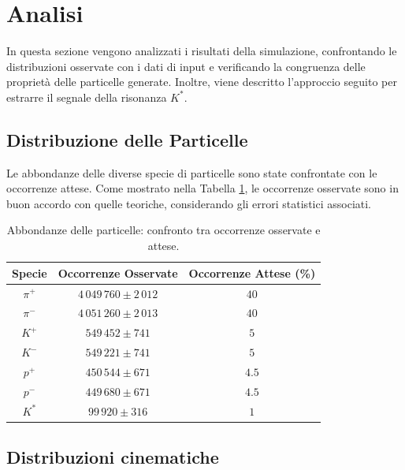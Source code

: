 \documentclass[a4paper,11pt]{article}
\begin{document}
\clearpage

\section{Analisi}

In questa sezione vengono analizzati i risultati della simulazione, confrontando le distribuzioni osservate con i dati di input e verificando la congruenza delle proprietà delle particelle generate. Inoltre, viene descritto l'approccio seguito per estrarre il segnale della risonanza \( K^* \).

\subsection{Distribuzione delle Particelle}

Le abbondanze delle diverse specie di particelle sono state confrontate con le occorrenze attese. Come mostrato nella Tabella \ref{tab:abbondanze}, le occorrenze osservate sono in buon accordo con quelle teoriche, considerando gli errori statistici associati.

\begin{table}[h!]
    \centering
    \begin{tabular}{|c|c|c|}
        \hline
        \textbf{Specie} & \textbf{Occorrenze Osservate} & \textbf{Occorrenze Attese (\%)} \\
        \hline
        $\pi^+$ & $4\,049\,760 \pm 2\,012$ & $40$ \\
        \hline
        $\pi^-$ & $4\,051\,260 \pm 2\,013$ & $40$ \\
        \hline
        $K^+$ & $549\,452 \pm 741$ & $5$ \\
        \hline
        $K^-$ & $549\,221 \pm 741$ & $5$ \\
        \hline
        $p^+$ & $450\,544 \pm 671$ & $4.5$ \\
        \hline
        $p^-$ & $449\,680 \pm 671$ & $4.5$ \\
        \hline
        $K^*$ & $99\,920 \pm 316$ & $1$ \\
        \hline
    \end{tabular}
    \caption{Abbondanze delle particelle: confronto tra occorrenze osservate e attese.}
    \label{tab:abbondanze}
\end{table}

\subsection{Distribuzioni cinematiche}
\end{document}

